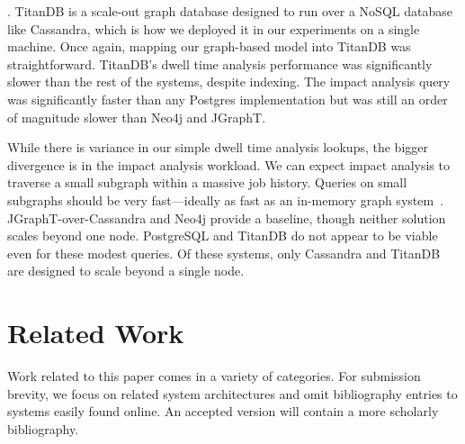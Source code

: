 \documentclass{sig-alternate}
\begin{document}
. TitanDB is a scale-out graph database designed to run over a NoSQL database like Cassandra, which is how we deployed it in our experiments on a single machine. %
Once again, mapping our graph-based model into TitanDB was straightforward.
TitanDB's dwell time analysis performance was significantly slower than the rest of the systems, despite indexing.
The impact analysis query was significantly faster than any Postgres implementation but was still an order of magnitude slower than Neo4j and JGraphT. 

\smallitembot
While there is variance in our simple dwell time analysis lookups, the bigger divergence is in the impact analysis workload.
We can expect impact analysis to traverse a small subgraph within a massive job history. Queries on small subgraphs should be very fast---ideally as fast as an in-memory graph system~\cite{mcsherry2015scalability}. JGraphT-over-Cassandra and Neo4j provide a baseline, though neither solution scales beyond one node. PostgreSQL and TitanDB do not appear to be viable even for these modest queries. Of these systems, only Cassandra and TitanDB are designed to scale beyond a single node.





\section{Related Work}
\label{sec:relwork}
Work related to this paper comes in a variety of categories. 
For submission brevity, we focus on related system architectures and omit bibliography entries to systems easily found online. 
An accepted version will contain a more scholarly bibliography.
\end{document}
